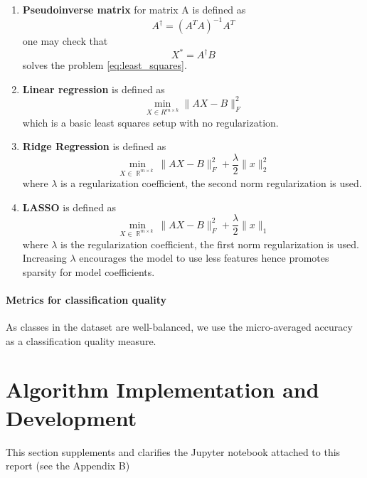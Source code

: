 \documentclass{article}
\DeclareMathOperator{\R}{\mathbb{R}}
\begin{document}
\begin{enumerate}
    \item \textbf{Pseudoinverse matrix} for matrix A is defined as
        \begin{equation}
            \label{eq:pinverse}
            A^\dag = (A^TA)^{-1}A^T
        \end{equation}
    one may check that 
        \[
            X^* = A^\dag B
        \]
    solves the problem \ref{eq:least_squares}. 
    \item \textbf{Linear regression} is defined as
        \begin{equation}
            \label{eq:linreg}
            \min_{X \in R^{m \times k}} \|AX - B\|^2_F
        \end{equation}
        which is a basic least squares setup with no regularization.
    \item \textbf{Ridge Regression} is defined as 
        \begin{equation}
            \label{eq:ridge}
            \min_{X \in \R^{m \times k}} \|AX - B\|_F^2 + \frac{\lambda}{2}\|x\|_2^2
        \end{equation}
        where $\lambda$ is a regularization coefficient, the second norm regularization is used.
    \item \textbf{LASSO} is defined as 
        \begin{equation}
            \label{eq:lasso}
            \min_{X \in \R^{m \times k}} \|AX - B\|_F^2 + \frac{\lambda}{2}\|x\|_1
        \end{equation}
        where $\lambda$ is the regularization coefficient, the first norm regularization is used. Increasing $\lambda$ encourages the model to use less features hence promotes sparsity for model coefficients. 
\end{enumerate}

\paragraph{Metrics for classification quality} As classes in the dataset are well-balanced, we use the micro-averaged accuracy as a classification quality measure.

\section{Algorithm Implementation and Development}
This section supplements and clarifies the Jupyter notebook attached to this report (see the Appendix B)
\end{document}
